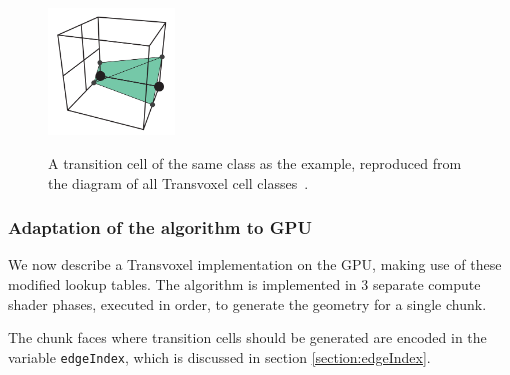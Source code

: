 \documentclass[11pt]{article}
\begin{document}
\begin{figure}
  \caption{A transition cell of the same class as the example, reproduced from the diagram of all Transvoxel cell classes~\cite{lengyel}.}
  \includegraphics[width=0.3\textwidth]{transition_cell_example_case.PNG}
  \label{fig:transition_cell_example_case}
\end{figure}

\subsubsection{Adaptation of the algorithm to GPU}

We now describe a Transvoxel implementation on the GPU, making use of these modified lookup tables. The algorithm is implemented in 3 separate compute shader phases, executed in order, to generate the geometry for a single chunk.

The chunk faces where transition cells should be generated are encoded in the variable \texttt{edgeIndex}, which is discussed in section \ref{section:edgeIndex}.
\end{document}
